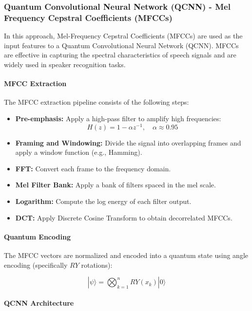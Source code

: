 \documentclass[conference]{IEEEtran}
\begin{document}
\subsubsection{Quantum Convolutional Neural Network (QCNN) - Mel Frequency Cepstral Coefficients (MFCCs)}

In this approach, Mel-Frequency Cepstral Coefficients (MFCCs) are used as the input features to a Quantum Convolutional Neural Network (QCNN). MFCCs are effective in capturing the spectral characteristics of speech signals and are widely used in speaker recognition tasks.

\paragraph{MFCC Extraction}

The MFCC extraction pipeline consists of the following steps:

\begin{itemize}
    \item \textbf{Pre-emphasis:} Apply a high-pass filter to amplify high frequencies:
    \[
    H(z) = 1 - \alpha z^{-1}, \quad \alpha \approx 0.95
    \]
    \item \textbf{Framing and Windowing:} Divide the signal into overlapping frames and apply a window function (e.g., Hamming).
    \item \textbf{FFT:} Convert each frame to the frequency domain.
    \item \textbf{Mel Filter Bank:} Apply a bank of filters spaced in the mel scale.
    \item \textbf{Logarithm:} Compute the log energy of each filter output.
    \item \textbf{DCT:} Apply Discrete Cosine Transform to obtain decorrelated MFCCs.
\end{itemize}

\paragraph{Quantum Encoding}

The MFCC vectors are normalized and encoded into a quantum state using angle encoding (specifically \( RY \) rotations):

\begin{equation}
|\psi\rangle = \bigotimes_{k=1}^{n} RY(x_k) |0\rangle
\end{equation}

\paragraph{QCNN Architecture}
\end{document}
